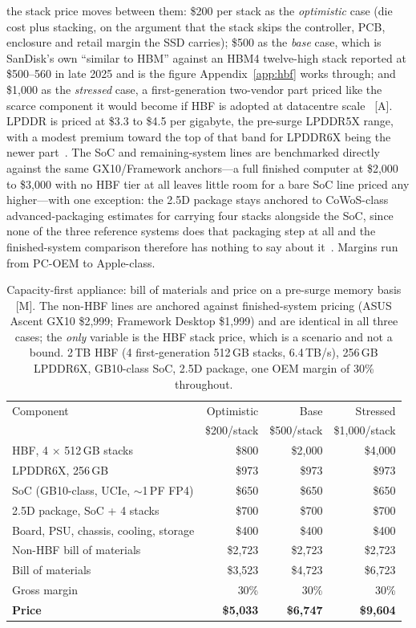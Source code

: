 the stack price moves between them: \$200 per stack as the \emph{optimistic} case (die cost plus stacking, on the argument that the stack skips the controller, PCB, enclosure and retail margin the SSD carries); \$500 as the \emph{base} case, which is SanDisk's own ``similar to HBM'' against an HBM4 twelve-high stack reported at \$500--560 in late 2025 and is the figure Appendix~\ref{app:hbf} works through; and \$1,000 as the \emph{stressed} case, a first-generation two-vendor part priced like the scarce component it would become if HBF is adopted at datacentre scale~\cite{hbf-hbm4-price,hbf-analysis} [A]. LPDDR is priced at \$3.3 to \$4.5 per gigabyte, the pre-surge LPDDR5X range, with a modest premium toward the top of that band for LPDDR6X being the newer part~\cite{lpddr-presurge}. The SoC and remaining-system lines are benchmarked directly against the same GX10/Framework anchors---a full finished computer at \$2,000 to \$3,000 with no HBF tier at all leaves little room for a bare SoC line priced any higher---with one exception: the 2.5D package stays anchored to CoWoS-class advanced-packaging estimates for carrying four stacks alongside the SoC, since none of the three reference systems does that packaging step at all and the finished-system comparison therefore has nothing to say about it~\cite{cowos-cost}. Margins run from PC-OEM to Apple-class.

\begin{table}[htbp]
  \centering
  \small
  \caption{Capacity-first appliance: bill of materials and price on a pre-surge memory basis [M]. The non-HBF lines are anchored against finished-system pricing (ASUS Ascent GX10 \$2,999; Framework Desktop \$1,999) and are identical in all three cases; the \emph{only} variable is the HBF stack price, which is a scenario and not a bound. 2\,TB HBF (4 first-generation 512\,GB stacks, 6.4\,TB/s), 256\,GB LPDDR6X, GB10-class SoC, 2.5D package, one OEM margin of 30\% throughout.}
  \label{tab:appliance-bom}
  \begin{tabular}{lrrr}
    \toprule
    Component & Optimistic & Base & Stressed \\
     & \$200/stack & \$500/stack & \$1,000/stack \\
    \midrule
    HBF, 4 $\times$ 512\,GB stacks & \$800 & \$2,000 & \$4,000 \\
    LPDDR6X, 256\,GB & \$973 & \$973 & \$973 \\
    SoC (GB10-class, UCIe, $\sim$1\,PF FP4) & \$650 & \$650 & \$650 \\
    2.5D package, SoC + 4 stacks & \$700 & \$700 & \$700 \\
    Board, PSU, chassis, cooling, storage & \$400 & \$400 & \$400 \\
    \midrule
    Non-HBF bill of materials & \$2,723 & \$2,723 & \$2,723 \\
    Bill of materials & \$3,523 & \$4,723 & \$6,723 \\
    Gross margin & 30\% & 30\% & 30\% \\
    \textbf{Price} & \textbf{\$5,033} & \textbf{\$6,747} & \textbf{\$9,604} \\
    \bottomrule
  \end{tabular}
\end{table}

